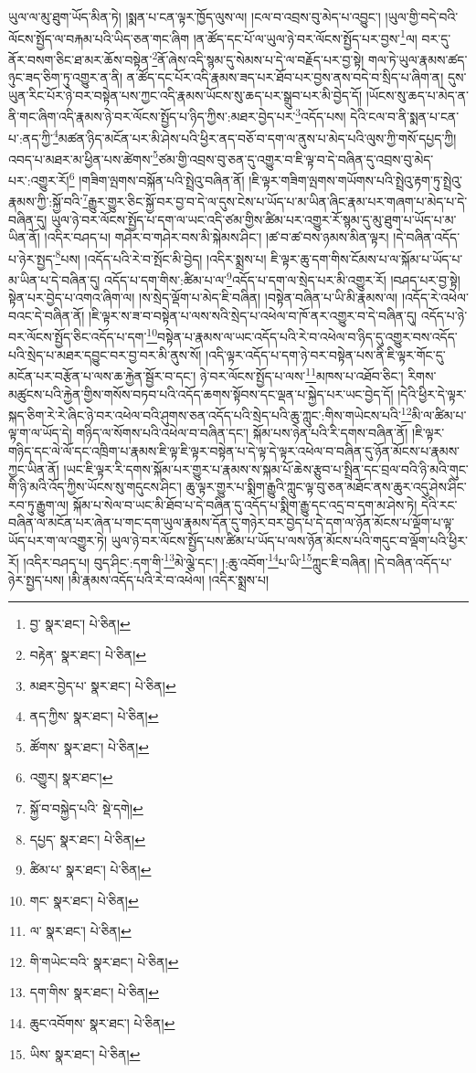ཡུལ་ལ་མུ་ཐུག་ཡོད་མིན་ཏེ། །སྨན་པ་ངན་ལྟར་ཁྱོད་ལུས་ལ། །ངལ་བ་འབྲས་བུ་མེད་པ་འབྱུང་། །ཡུལ་གྱི་བདེ་བའི་ལོངས་སྤྱོད་ལ་བརྐམ་པའི་ཡིད་ཅན་གང་ཞིག །ན་ཚོད་དང་པོ་ལ་ཡུལ་ཉེ་བར་ལོངས་སྤྱོད་པར་བྱས་\footnote{བྱ་  སྣར་ཐང་།  པེ་ཅིན། }ལ། བར་དུ་ནོར་བསག་ཅིང་ཐ་མར་ཆོས་བསྟེན་\footnote{བརྟེན་  སྣར་ཐང་།  པེ་ཅིན། }ནོ་ཞེས་འདི་སྙམ་དུ་སེམས་པ་དེ་ལ་བརྗོད་པར་བྱ་སྟེ། གལ་ཏེ་ཡུལ་རྣམས་ཚད་ཉུང་ཟད་ཅིག་ཏུ་འགྱུར་ན་ནི། ན་ཚོད་དང་པོར་འདི་རྣམས་ཟད་པར་ཐོབ་པར་བྱས་ནས་བདེ་བ་སྲིད་པ་ཞིག་ན། དུས་ཡུན་རིང་པོར་ཉེ་བར་བསྟེན་པས་ཀྱང་འདི་རྣམས་ཡོངས་སུ་ཆད་པར་སྒྲུབ་པར་མི་བྱེད་དོ། །ཡོངས་སུ་ཆད་པ་མེད་ན་ནི་གང་ཞིག་འདི་རྣམས་ཉེ་བར་ལོངས་སྤྱོད་པ་ཉིད་ཀྱིས་:མཐར་བྱེད་པར་\footnote{མཐར་བྱེད་པ་  སྣར་ཐང་།  པེ་ཅིན། }འདོད་པས། དེའི་ངལ་བ་ནི་སྨན་པ་ངན་པ་:ནད་ཀྱི་\footnote{ནད་ཀྱིས་  སྣར་ཐང་།  པེ་ཅིན། }མཚན་ཉིད་མངོན་པར་མི་ཤེས་པའི་ཕྱིར་ནད་བཅོ་བ་དག་ལ་ནུས་པ་མེད་པའི་ལུས་ཀྱི་གསོ་དཔྱད་ཀྱི། འབད་པ་མཐར་མ་ཕྱིན་པས་ཚེགས་\footnote{ཚོགས་  སྣར་ཐང་།  པེ་ཅིན། }ཙམ་གྱི་འབྲས་བུ་ཅན་དུ་འགྱུར་བ་ཇི་ལྟ་བ་དེ་བཞིན་དུ་འབྲས་བུ་མེད་པར་:འགྱུར་རོ།\footnote{འགྱུར།  སྣར་ཐང་། } །གཟིག་ལྤགས་བསྐོན་པའི་སྤྲེའུ་བཞིན་ནོ། །ཇི་ལྟར་གཟིག་ལྤགས་གཡོགས་པའི་སྤྲེའུ་རྟག་ཏུ་སྤྲེའུ་རྣམས་ཀྱི་:སྐྱོ་བའི་\footnote{སྐྱོ་བ་བསྐྱེད་པའི་  སྡེ་དགེ། }རྒྱུར་གྱུར་ཅིང་སྐྱོ་བར་བྱ་བ་དེ་ལ་དུས་ངེས་པ་ཡོད་པ་མ་ཡིན་ཞིང་རྣམ་པར་གཞག་པ་མེད་པ་དེ་བཞིན་དུ། ཡུལ་ཉེ་བར་ལོངས་སྤྱོད་པ་དག་ལ་ཡང་འདི་ཙམ་གྱིས་ཚིམ་པར་འགྱུར་རོ་སྙམ་དུ་མུ་ཐུག་པ་ཡོད་པ་མ་ཡིན་ནོ། །འདིར་བཤད་པ། གཤེར་བ་གཤེར་བས་མི་སྐེམས་ཤིང་། །ཚ་བ་ཚ་བས་ཉམས་མིན་ལྟར། །དེ་བཞིན་འདོད་པ་ཉེར་སྤྱད་\footnote{དཔྱད་  སྣར་ཐང་།  པེ་ཅིན། }པས། །འདོད་པའི་རེ་བ་སྤོང་མི་བྱེད། །འདིར་སྨྲས་པ། ཇི་ལྟར་ཆུ་དག་གིས་ངོམས་པ་ལ་སྐོམ་པ་ཡོད་པ་མ་ཡིན་པ་དེ་བཞིན་དུ། འདོད་པ་དག་གིས་:ཚིམ་པ་ལ་\footnote{ཚིམ་པ་  སྣར་ཐང་།  པེ་ཅིན། }འདོད་པ་དག་ལ་སྲེད་པར་མི་འགྱུར་རོ། །བཤད་པར་བྱ་སྟེ། སྟེན་པར་བྱེད་པ་འགའ་ཞིག་ལ། །ས་སྲེད་ལྡོག་པ་མེད་ཇི་བཞིན། །བསྟེན་བཞིན་པ་ཡི་མི་རྣམས་ལ། །འདོད་རེ་འཕེལ་བའང་དེ་བཞིན་ནོ། །ཇི་ལྟར་ས་ཟ་བ་བསྟེན་པ་ལས་སའི་སྲེད་པ་འཕེལ་བ་ཁོ་ནར་འགྱུར་བ་དེ་བཞིན་དུ། འདོད་པ་ཉེ་བར་ལོངས་སྤྱོད་ཅིང་འདོད་པ་དག་\footnote{གང་  སྣར་ཐང་།  པེ་ཅིན། }བསྟེན་པ་རྣམས་ལ་ཡང་འདོད་པའི་རེ་བ་འཕེལ་བ་ཉིད་དུ་འགྱུར་བས་འདོད་པའི་སྲེད་པ་མཐར་དབྱུང་བར་བྱ་བར་མི་ནུས་སོ། །འདི་ལྟར་འདོད་པ་དག་ཉེ་བར་བསྟེན་པས་ནི་ཇི་ལྟར་གོང་དུ་མངོན་པར་བརྩོན་པ་ལས་ཆ་རྐྱེན་སྦྱོར་བ་དང་། ཉེ་བར་ལོངས་སྤྱོད་པ་ལས་\footnote{ལ་  སྣར་ཐང་།  པེ་ཅིན། }མཁས་པ་འཐོབ་ཅིང་། རིགས་མཚུངས་པའི་རྐྱེན་གྱིས་གསོས་བཏབ་པའི་འདོད་ཆགས་སྟོབས་དང་ལྡན་པ་སྐྱེད་པར་ཡང་བྱེད་དོ། །དེའི་ཕྱིར་དེ་ལྟར་སྐད་ཅིག་རེ་རེ་ཞིང་ཉེ་བར་འཕེལ་བའི་ཤུགས་ཅན་འདོད་པའི་སྲེད་པའི་ཆུ་ཀླུང་:གིས་གཡེངས་པའི་\footnote{གི་གཡེང་བའི་  སྣར་ཐང་།  པེ་ཅིན། }མི་ལ་ཚིམ་པ་ལྟ་ག་ལ་ཡོད་དེ། གཉིད་ལ་སོགས་པའི་འཕེལ་བ་བཞིན་དང་། སྐོམ་པས་ཉེན་པའི་རི་དགས་བཞིན་ནོ། །ཇི་ལྟར་གཉིད་དང་ལེ་ལོ་དང་འཁྲིག་པ་རྣམས་ཇི་ལྟ་ཇི་ལྟར་བསྟེན་པ་དེ་ལྟ་དེ་ལྟར་འཕེལ་བ་བཞིན་དུ་ཉོན་མོངས་པ་རྣམས་ཀྱང་ཡིན་ནོ། །ཡང་ཇི་ལྟར་རི་དགས་སྐོམ་པར་གྱུར་པ་རྣམས་ས་སྐམ་པོ་ཆེས་རྩུབ་པ་སྤྲིན་དང་བྲལ་བའི་ཉི་མའི་གུང་གི་ཉི་མའི་འོད་ཀྱིས་ཡོངས་སུ་གདུངས་ཤིང་། ཆུ་ལྟར་གྱུར་པ་སྨིག་རྒྱུའི་ཀླུང་ལྟ་བུ་ཅན་མཐོང་ནས་ཆུར་འདུ་ཤེས་ཤིང་རབ་ཏུ་རྒྱུག་ལ། སྐོམ་པ་སེལ་བ་ཡང་མི་ཐོབ་པ་དེ་བཞིན་དུ་འདོད་པ་སྨིག་རྒྱུ་དང་འདྲ་བ་དག་མ་ཤེས་ཏེ། དེའི་རང་བཞིན་ལ་མངོན་པར་ཞེན་པ་གང་དག་ཡུལ་རྣམས་དོན་དུ་གཉེར་བར་བྱེད་པ་དེ་དག་ལ་ཉོན་མོངས་པ་ལྡོག་པ་ལྟ་ཡོད་པར་ག་ལ་འགྱུར་ཏེ། ཡུལ་ཉེ་བར་ལོངས་སྤྱོད་པས་ཚིམ་པ་ཡོད་པ་ལས་ཉོན་མོངས་པའི་གདུང་བ་ལྡོག་པའི་ཕྱིར་རོ། །འདིར་བཤད་པ། བུད་ཤིང་:དག་གི་\footnote{དག་གིས་  སྣར་ཐང་།  པེ་ཅིན། }མེ་ལྕེ་དང་། །:ཆུ་འབོག་\footnote{ཆུང་འབོགས་  སྣར་ཐང་།  པེ་ཅིན། }པ་ཡི་\footnote{ཡིས་  སྣར་ཐང་།  པེ་ཅིན། }ཀླུང་ཇི་བཞིན། །དེ་བཞིན་འདོད་པ་ཉེར་སྤྱད་པས། །མི་རྣམས་འདོད་པའི་རེ་བ་འཕེལ། །འདིར་སྨྲས་པ། 